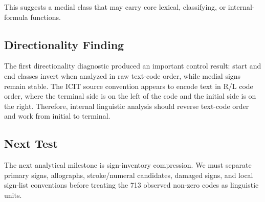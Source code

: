 This suggests a medial class that may carry core lexical, classifying, or internal-formula functions.

\subsection{Directionality Finding}

The first directionality diagnostic produced an important control result: start and end classes invert when analyzed in raw text-code order, while medial signs remain stable. The ICIT source convention appears to encode text in R/L code order, where the terminal side is on the left of the code and the initial side is on the right. Therefore, internal linguistic analysis should reverse text-code order and work from initial to terminal.

\subsection{Next Test}

The next analytical milestone is sign-inventory compression. We must separate primary signs, allographs, stroke/numeral candidates, damaged signs, and local sign-list conventions before treating the 713 observed non-zero codes as linguistic units.

